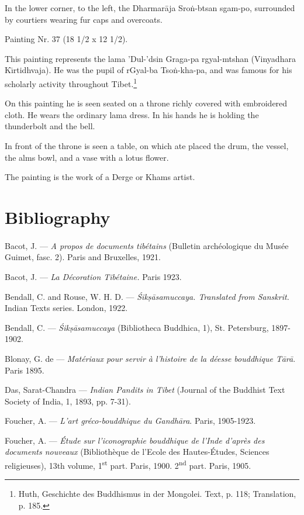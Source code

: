 \documentclass[a4paper, 12pt, oneside]{article}
\begin{document}
In the lower corner, to the left, the Dharmar\={a}ja Sro\.{n}-btsan sgam-po, surrounded by courtiers wearing fur caps and overcoats.

\bigskip

Painting Nr. 37 (18 1/2 x 12 1/2).

\bigskip

This painting represents the lama 'Dul-'dsin Graga-pa rgyal-mtshan (Vinyadhara K\={\i}rtidhvaja). He was the pupil of rGyal-ba Tso\.{n}-kha-pa, and was famous for his scholarly activity throughout Tibet.\footnote{Huth, Geschichte des Buddhismus in der Mongolei. Text, p. 118; Translation, p. 185.}

On this painting he is seen seated on a throne richly covered with embroidered cloth. He wears the ordinary lama dress. In his hands he is holding the thunderbolt and the bell.

In front of the throne is seen a table, on which ate placed the drum, the vessel, the alms bowl, and a vase with a lotus flower.

The painting is the work of a Derge or Khams artist.

\clearpage
\section*{Bibliography}
\paragraph{}
\small
Bacot, J. --- \emph{A propos de documents tibétains} (Bulletin archéologique du Musée Guimet, fasc. 2). Paris and Bruxelles, 1921.

Bacot, J. --- \emph{La Décoration Tibétaine.} Paris 1923.

Bendall, C. and Rouse, W. H. D. --- \emph{\'{S}ik\d{s}\={a}samuccaya. Translated from Sanskrit.} Indian Texts series. London, 1922.

Bendall, C. --- \emph{\'{S}ik\d{s}\={a}samuccaya} (Bibliotheca Buddhica, 1), St. Petersburg, 1897-1902.

Blonay, G. de --- \emph{Matériaux pour servir à l'histoire de la déesse bouddhique T\={a}r\={a}}. Paris 1895.

Das, Sarat-Chandra --- \emph{Indian Pandits in Tibet} (Journal of the Buddhist Text Society of India, 1, 1893, pp. 7-31).

Foucher, A. --- \emph{L'art gréco-bouddhique du Gandh\={a}ra}. Paris, 1905-1923.

Foucher, A. --- \emph{Étude sur l'iconographie bouddhique de l'Inde d'après des documents nouveaux} (Bibliothèque de l'Ecole des Hautes-Études, Sciences religieuses), 13th volume, 1\textsuperscript{st} part. Paris, 1900. 2\textsuperscript{nd} part. Paris, 1905.
\end{document}
